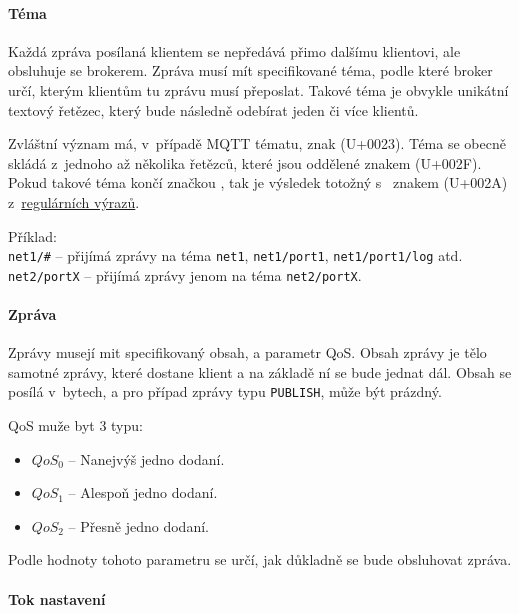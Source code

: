 \paragraph{Téma}
\label{par:topic}

Každá zpráva posílaná klientem se nepředává přimo dalšímu klientovi, ale obsluhuje se brokerem. Zpráva musí mít specifikované téma, podle které broker určí, kterým klientům tu zprávu musí přeposlat. Takové téma je obvykle unikátní textový řetězec, který bude následně odebírat jeden či více klientů.

Zvláštní význam má, v~případě MQTT tématu, znak \uv{\#} (U+0023). Téma se obecně skládá z~jednoho až několika řetězců, které jsou oddělené znakem \uv{/} (U+002F). Pokud takové téma končí značkou \uv{\#}, tak je výsledek totožný s~ znakem \uv{*} (U+002A) z~\href{https://en.wikipedia.org/wiki/Regular_expression}{regulárních výrazů}.

\begin{tabbing}
Příklad: \= \\
\> \texttt{net1/\#} -- přijímá zprávy na téma \texttt{net1}, \texttt{net1/port1}, \texttt{net1/port1/log} atd.\\
\> \texttt{net2/portX} -- přijímá zprávy jenom na téma \texttt{net2/portX}. \\
\end{tabbing}

\paragraph{Zpráva}
\label{par:message}

Zprávy musejí mit specifikovaný obsah, a parametr QoS. Obsah zprávy je tělo samotné zprávy, které dostane klient a na základě ní se bude jednat dál. Obsah se posílá v~bytech, a pro případ zprávy typu \texttt{PUBLISH}, může být prázdný.

QoS muže byt 3 typu:
\begin{itemize}
 \item $QoS_0$ -- Nanejvýš jedno dodaní.
 \item $QoS_1$ -- Alespoň jedno dodaní.
 \item $QoS_2$ -- Přesně jedno dodaní.
\end{itemize}

Podle hodnoty tohoto parametru se určí, jak důkladně se bude obsluhovat zpráva.

\paragraph{Tok nastavení}

